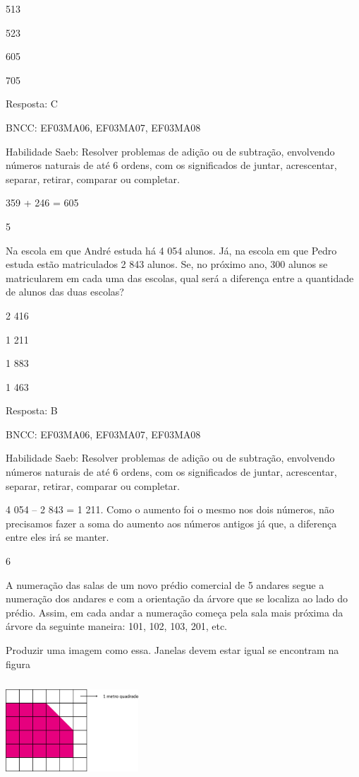 \begin{escolha}
\begin{escolha}
\begin{escolha}
\item
  513
\item
  523
\item
  605
\item
  705
\end{escolha}

Resposta: C

BNCC: EF03MA06, EF03MA07, EF03MA08

Habilidade Saeb: Resolver problemas de adição ou de subtração,
envolvendo números naturais de até 6 ordens, com os significados de
juntar, acrescentar, separar, retirar, comparar ou completar.

359 + 246 = 605

\num{5}

Na escola em que André estuda há 4 054 alunos. Já, na escola em que
Pedro estuda estão matriculados 2 843 alunos. Se, no próximo ano, 300
alunos se matricularem em cada uma das escolas, qual será a diferença
entre a quantidade de alunos das duas escolas?

\begin{escolha}
\item
  2 416
\item
  1 211
\item
  1 883
\item
  1 463
\end{escolha}

Resposta: B

BNCC: EF03MA06, EF03MA07, EF03MA08

Habilidade Saeb: Resolver problemas de adição ou de subtração,
envolvendo números naturais de até 6 ordens, com os significados de
juntar, acrescentar, separar, retirar, comparar ou completar.

4 054 -- 2 843 = 1 211. Como o aumento foi o mesmo nos dois números, não
precisamos fazer a soma do aumento aos números antigos já que, a
diferença entre eles irá se manter.

\num{6}

A numeração das salas de um novo prédio comercial de 5 andares segue a
numeração dos andares e com a orientação da árvore que se localiza ao
lado do prédio. Assim, em cada andar a numeração começa pela sala mais
próxima da árvore da seguinte maneira: 101, 102, 103, 201, etc.

Produzir uma imagem como essa. Janelas devem estar igual se encontram na
figura

\includegraphics[width=1.96154in,height=1.44792in]{media/image108.png}


\end{escolha}
\end{escolha}
